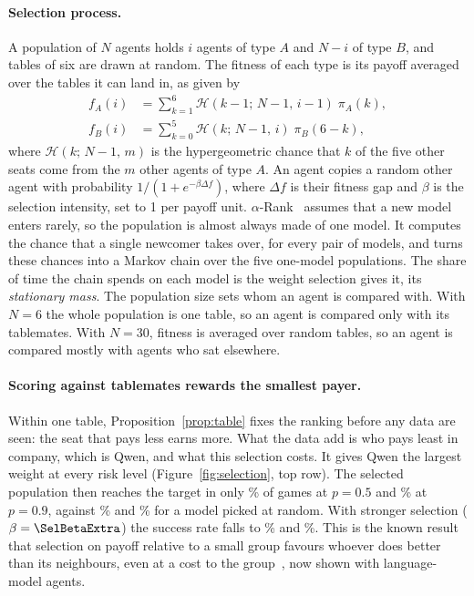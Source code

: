 \paragraph{Selection process.}
A population of $N$ agents holds $i$ agents of type $A$ and $N-i$ of type $B$, and tables of
six are drawn at random. The fitness of each type is its payoff averaged over the tables it
can land in, as given by
\begin{align}
f_A(i) &= \textstyle\sum_{k=1}^{6} \mathcal{H}(k-1;\,N-1,\,i-1)\;\pi_A(k), \label{eq:fitness}\\
f_B(i) &= \textstyle\sum_{k=0}^{5} \mathcal{H}(k;\,N-1,\,i)\;\pi_B(6-k), \nonumber
\end{align}
where $\mathcal{H}(k;\,N-1,\,m)$ is the hypergeometric chance that $k$ of the five other seats
come from the $m$ other agents of type $A$. An agent copies a random other agent with
probability $1/(1+e^{-\beta\Delta f})$, where $\Delta f$ is their fitness gap and $\beta$ is
the selection intensity, set to 1 per payoff unit. $\alpha$-Rank~\cite{omidshafiei2019alpha}
assumes that a new model enters rarely, so the population is almost always made of one model.
It computes the chance that a single newcomer takes over, for every pair of models, and turns
these chances into a Markov chain over the five one-model populations. The share of time the
chain spends on each model is the weight selection gives it, its \emph{stationary mass}. The
population size sets whom an agent is compared with. With $N=6$ the whole population is one
table, so an agent is compared only with its tablemates. With $N=30$, fitness is averaged over
random tables, so an agent is compared mostly with agents who sat elsewhere.

\paragraph{Scoring against tablemates rewards the smallest payer.}
Within one table, Proposition~\ref{prop:table} fixes the ranking before any data are seen:
the seat that pays less earns more. What the data add is who pays least in company, which is
Qwen, and what this selection costs. It gives Qwen the largest weight at every risk level
(Figure~\ref{fig:selection}, top row). The selected population then reaches the target in only
\SelWithinReachMid\% of games at $p=0.5$ and \SelWithinReachHigh\% at $p=0.9$, against
\SelUniformReachMid\% and \SelUniformReachHigh\% for a model picked at random. With stronger
selection ($\beta=\SelBetaExtra$) the success rate falls to \SelStrongWithinReachMid\% and
\SelStrongWithinReachHigh\%. This is the known result that selection on payoff relative to a
small group favours whoever does better than its neighbours, even at a cost to the
group~\cite{schaffer1988evolutionarily}, now shown with language-model agents.

